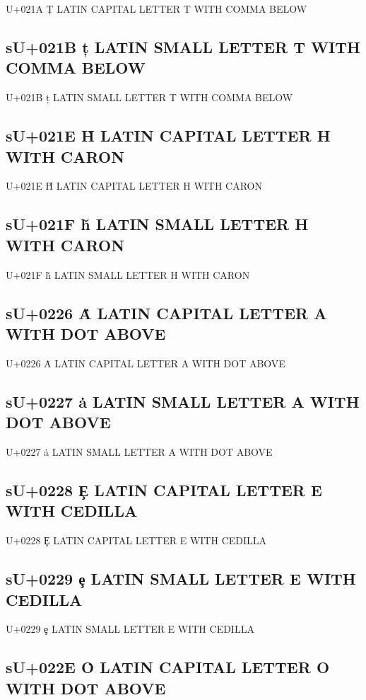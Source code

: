 U+021A Ț  LATIN CAPITAL LETTER T WITH COMMA BELOW

\subsection{sU+021B ț  LATIN SMALL LETTER T WITH COMMA BELOW}

U+021B ț  LATIN SMALL LETTER T WITH COMMA BELOW

\subsection{sU+021E Ȟ LATIN CAPITAL LETTER H WITH CARON}

U+021E Ȟ LATIN CAPITAL LETTER H WITH CARON

\subsection{sU+021F ȟ LATIN SMALL LETTER H WITH CARON}

U+021F ȟ LATIN SMALL LETTER H WITH CARON

\subsection{sU+0226 Ȧ LATIN CAPITAL LETTER A WITH DOT ABOVE}

U+0226 Ȧ LATIN CAPITAL LETTER A WITH DOT ABOVE

\subsection{sU+0227 ȧ LATIN SMALL LETTER A WITH DOT ABOVE}

U+0227 ȧ LATIN SMALL LETTER A WITH DOT ABOVE

\subsection{sU+0228 Ȩ LATIN CAPITAL LETTER E WITH CEDILLA}

U+0228 Ȩ LATIN CAPITAL LETTER E WITH CEDILLA

\subsection{sU+0229 ȩ LATIN SMALL LETTER E WITH CEDILLA}

U+0229 ȩ LATIN SMALL LETTER E WITH CEDILLA

\subsection{sU+022E Ȯ LATIN CAPITAL LETTER O WITH DOT ABOVE}

